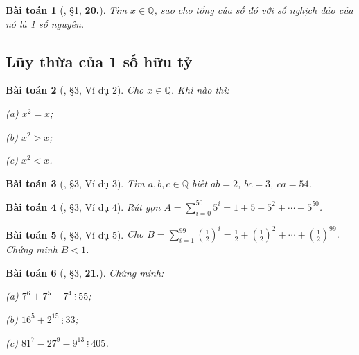 \documentclass{article}
\numberwithin{equation}{section}
\newtheorem{baitoan}{Bài toán}[section]
\begin{document}
\begin{baitoan}[\cite{Binh_Toan_7_tap_1}, \S1, \textbf{20.}]
	Tìm $x\in\mathbb{Q}$, sao cho tổng của số đó với số nghịch đảo của nó là 1 số nguyên.
\end{baitoan}


\subsection{Lũy thừa của 1 số hữu tỷ}

\begin{baitoan}[\cite{Binh_Toan_7_tap_1}, \S3, Ví dụ 2]
	Cho $x\in\mathbb{Q}$. Khi nào thì:
	\begin{enumerate*}
		\item[(a)] $x^2 = x$;
		\item[(b)] $x^2 > x$;
		\item[(c)] $x^2 < x$.
	\end{enumerate*}
\end{baitoan}

\begin{baitoan}[\cite{Binh_Toan_7_tap_1}, \S3, Ví dụ 3]
	Tìm $a,b,c\in\mathbb{Q}$ biết $ab = 2$, $bc = 3$, $ca = 54$.
\end{baitoan}

\begin{baitoan}[\cite{Binh_Toan_7_tap_1}, \S3, Ví dụ 4]
	Rút gọn $A = \sum_{i=0}^{50} 5^i = 1 + 5 + 5^2 + \cdots + 5^{50}$.
\end{baitoan}

\begin{baitoan}[\cite{Binh_Toan_7_tap_1}, \S3, Ví dụ 5]
	Cho $B = \sum_{i=1}^{99} \left(\frac{1}{2}\right)^i = \frac{1}{2} + \left(\frac{1}{2}\right)^2 + \cdots + \left(\frac{1}{2}\right)^{99}$. Chứng minh $B < 1$.
\end{baitoan}

\begin{baitoan}[\cite{Binh_Toan_7_tap_1}, \S3, \textbf{21.}]
	Chứng minh:
	\begin{enumerate*}
		\item[(a)] $7^6 + 7^5 - 7^4\ \vdots\ 55$;
		\item[(b)] $16^5 + 2^{15}\ \vdots\ 33$;
		\item[(c)] $81^7 - 27^9 - 9^{13}\ \vdots\ 405$.
	\end{enumerate*}
\end{baitoan}
\end{document}
